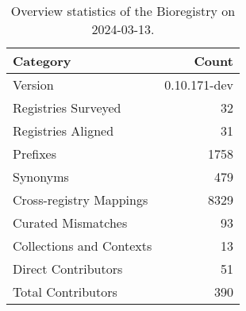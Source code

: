 \begin{table}
\caption{Overview statistics of the Bioregistry on 2024-03-13.}
\label{tab:bioregistry-summary}
\begin{tabular}{lr}
\toprule
Category & Count \\
\midrule
Version & 0.10.171-dev \\
Registries Surveyed & 32 \\
Registries Aligned & 31 \\
Prefixes & 1758 \\
Synonyms & 479 \\
Cross-registry Mappings & 8329 \\
Curated Mismatches & 93 \\
Collections and Contexts & 13 \\
Direct Contributors & 51 \\
Total Contributors & 390 \\
\bottomrule
\end{tabular}
\end{table}
